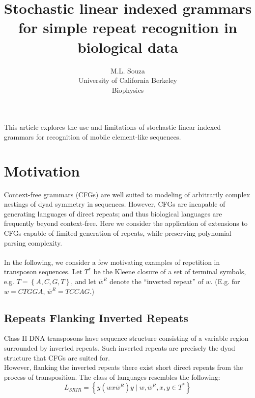 \documentclass[11pt]{article}
\begin{document}
\title{Stochastic linear indexed grammars for simple repeat recognition in biological data}

\author{M.L. Souza\\
University of California Berkeley\\
Biophysics}

\renewcommand{\today}{June 13, 2011}
\maketitle
This article explores the use and limitations of stochastic linear indexed grammars for recognition of mobile element-like sequences.

\section {Motivation}
Context-free grammars (CFGs) are well suited to modeling of arbitrarily complex nestings of dyad symmetry in sequences.
However, CFGs are incapable of generating languages of direct repeats; and thus biological languages are frequently beyond context-free.
Here we consider the application of extensions to CFGs capable of limited generation of repeats, while preserving
polynomial parsing complexity. \\ \\
In the following, we consider a few motivating examples of repetition in transposon sequences. Let $T^*$ be the Kleene closure of a set of terminal symbols, e.g. $T = \left \{ A,C,G,T \right \}$,
and let $\overline{w}^R$ denote the ``inverted repeat'' of $w$. (E.g. for $w = CTGGA$, $\overline{w}^R = TCCAG$.)

\subsection {Repeats Flanking Inverted Repeats}
Class II DNA transposons have sequence structure consisting of a variable region surrounded by inverted repeats.
Such inverted repeats are precisely the dyad structure that CFGs are suited for.\\
However, flanking the inverted repeats there exist short direct repeats from the process of transposition.
The class of languages resembles the following:
\[
L_{SRIR} = \left \{ y(wx\overline{w}^R)y \mid w,\overline{w}^R,x,y \in T^* \right \} 
\]
\end{document}
